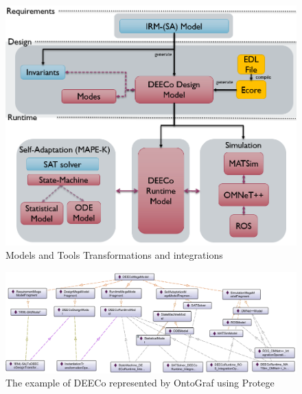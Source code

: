 \begin{figure}[!htb]
\centering
\includegraphics[scale=0.50]{figures/deeco_tools_adv.PNG}
\caption{Models and Tools Transformations and integrations}
\label{fig:deeco_tools}
\end{figure}

\begin{figure}[!h]
\centering
\includegraphics[scale=0.55]{figures/ontology.PNG}
\caption{The example of DEECo represented by OntoGraf using Protege}
\label{fig:deeco_ontology}
\end{figure}


